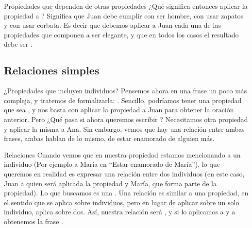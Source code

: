 
\begin{frame}{Propiedades que dependen de otras propiedades}
  ¿Qué significa entonces aplicar la propiedad  a
  ?
  \jump
  Significa que Juan debe cumplir con ser hombre, con usar zapatos y con usar
  corbata. Es decir que debemos aplicar a Juan cada una de las propiedades que
  componen a ser elegante, y que en todos los casos el resultado debe ser \fulltrue.
  \jump
\end{frame}


\subsection{Relaciones simples}


\begin{frame}{¿Propiedades que incluyen individuos?}
  Pensemos ahora en una frase un poco más compleja, y tratemos de formalizarla:
  .
  \jump
  Sencillo, podríamos tener una propiedad que sea
  , y nos basta con aplicar la propiedad
  a Juan para obtener la oración anterior.
  \jump
  Pero ¿Qué pasa si ahora queremos escribir  ?
  \jump
  Necesitamos otra propiedad  y aplicar la
  misma a Ana.
  \jump
  Sin embargo, vemos que hay una relación entre ambas frases, ambas hablan de
  lo mismo, de estar enamorado de alguien más.
\end{frame}


\begin{frame}{Relaciones}
  Cuando vemos que en nuestra propiedad estamos mencionando a un individuo (Por ejemplo
  a María en ``Estar enamorado de María''), lo que queremos en realidad es expresar
  una relación entre dos individuos (en este caso, Juan a quien será aplicada la
  propiedad y María, que forma parte de la propiedad). Lo que buscamos es una
  .
  \jump
  Una relación es similar a una propiedad, en el sentido que se aplica sobre
  individuos, pero en lugar de aplicar sobre un solo individuo, aplica sobre dos.
  \jump
  Así, nuestra relación será , y si lo aplicamos
  a  y a  obtenemos la frase
  .
  \jump
\end{frame}

